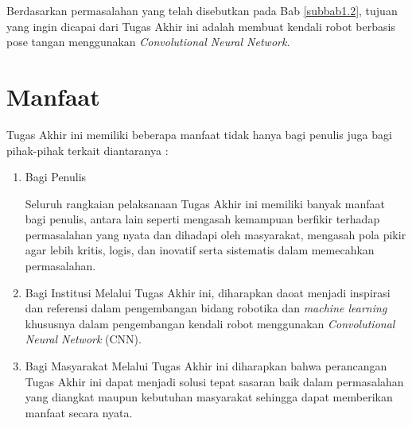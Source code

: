 Berdasarkan permasalahan yang telah disebutkan pada Bab \ref{subbab1.2}, tujuan yang ingin dicapai dari Tugas Akhir ini adalah membuat kendali robot berbasis pose tangan menggunakan \textit{Convolutional Neural Network}.


\section{Manfaat}
Tugas Akhir ini memiliki beberapa manfaat tidak hanya bagi penulis juga bagi pihak-pihak terkait diantaranya :
\begin{enumerate}
	\item Bagi Penulis \par
	Seluruh rangkaian pelaksanaan Tugas Akhir ini memiliki banyak manfaat bagi penulis, antara lain seperti mengasah kemampuan berfikir terhadap permasalahan yang nyata dan dihadapi oleh masyarakat, mengasah pola pikir agar lebih kritis, logis, dan inovatif serta sistematis dalam memecahkan permasalahan.
	\item Bagi Institusi
	Melalui Tugas Akhir ini, diharapkan daoat menjadi inspirasi dan referensi dalam pengembangan bidang robotika dan \emph{machine learning} khususnya dalam pengembangan kendali robot menggunakan \emph{Convolutional Neural Network} (CNN).
	\item Bagi Masyarakat
	Melalui Tugas Akhir ini diharapkan bahwa perancangan Tugas Akhir ini dapat menjadi solusi tepat sasaran baik dalam permasalahan yang diangkat maupun kebutuhan masyarakat sehingga dapat memberikan manfaat secara nyata.
\end{enumerate}

